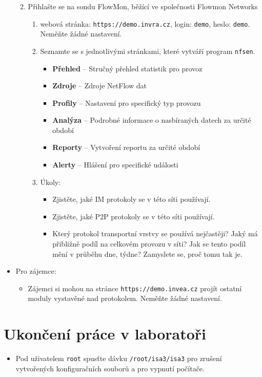 \begin{itemize}
\begin{enumerate}
\begin{enumerate}
                \end{enumerate}
        \item Přihlašte se na sondu FlowMon, běžící ve společnosti Flowmon Networks
            \begin{enumerate}
                \item webová stránka: {\tt https://demo.invra.cz}, login: {\tt demo}, heslo: {\tt demo}.
                      Neměňte žádné nastavení.
                \item Seznamte se s jednotlivými stránkami, které vytváří program {\tt nfsen}.
                   \begin{itemize}
                     \item {\bf Přehled} -- Stručný přehled statistik pro provoz
                     \item {\bf Zdroje} -- Zdroje NetFlow dat 
                     \item {\bf Profily} -- Nastavení pro specifický typ provozu 
                     \item {\bf Analýza} -- Podrobné informace o nasbíraných datech za určité období
                     \item {\bf Reporty} -- Vytvoření reportu za určité období
                     \item {\bf Alerty} -- Hlášení pro specifické události
                   \end{itemize}
             \item Úkoly:
                \begin{itemize}
                   \item Zjistěte, jaké IM protokoly se v této síti používají.
                   \item Zjistěte, jaké P2P protokoly se v této síti používají.
                   \item Který protokol transportní vrstvy se používá
                   nejčastěji? Jaký má přibližně podíl na celkovém provozu v
                   síti? Jak se tento podíl mění v průběhu dne, týdne? Zamyslete
                   se, proč tomu tak je.
                \end{itemize}
            \end{enumerate}       
        \end{enumerate} 
    \item Pro zájemce:
        \begin{itemize}
            \item Zájemci si mohou na stránce {\tt https://demo.invea.cz} projít
      ostatní moduly vystavěné nad protokolem. Neměňte žádné nastavení.
        \end{itemize}
    \end{itemize}
 
\section*{Ukončení práce v laboratoři}
\begin{itemize}
  \item Pod uživatelem {\tt root} spusťte dávku {\tt /root/isa3/isa3} pro zrušení
  vytvořených konfiguračních souborů a pro vypnutí počítače.
\end{itemize}
